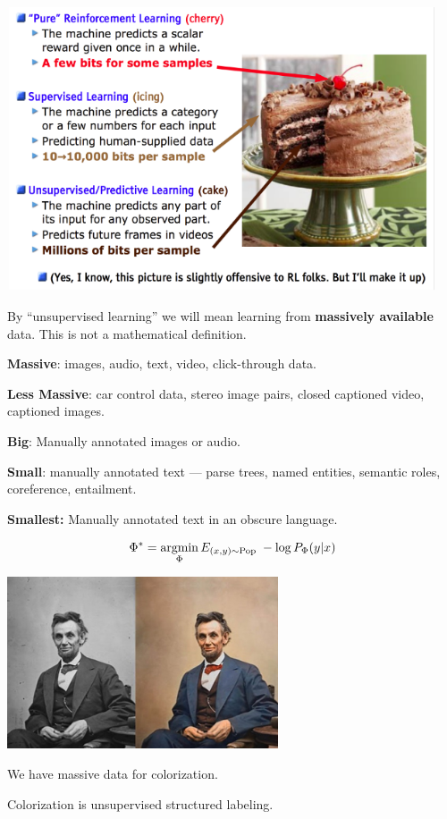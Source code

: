 {

\centerline{\includegraphics[width = 8in]{../images/cake}}



By ``unsupervised learning'' we will mean learning from {\bf massively available} data.  This is not a mathematical definition.

\vfill
{\bf Massive}: images, audio, text, video, click-through data.

\vfill
{\bf Less Massive}: car control data, stereo image pairs, closed captioned video, captioned images.

\vfill
{\bf Big}: Manually annotated images or audio.

\vfill
{\bf Small}: manually annotated text --- parse trees, named entities, semantic roles, coreference, entailment.

\vfill
{\bf Smallest:} Manually annotated text in an obscure language.


$$\Phi^* = \operatorname*{argmin}_\Phi E_{(x,y) \sim \mathrm{Pop}}\;-\log P_\Phi(y|x)$$

\vfill
\centerline{\includegraphics[height=2in]{../images/Colorization}}

\vfill
We have massive data for colorization.

\vfill
Colorization is unsupervised structured labeling.



}

